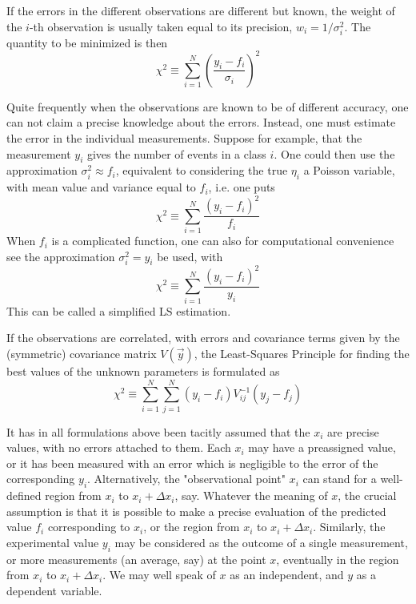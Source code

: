 \documentclass[../main.tex]{subfiles}
\begin{document}
If the errors in the different observations are different but known,
the weight of the $i$-th observation is usually taken equal to its precision,
$w_i = 1 / \sigma_i^2$.
The quantity to be minimized is then
%
\begin{equation}
    \chi^2 \equiv \sum_{i=1}^N \left(\frac{y_i - f_i}{\sigma_i}\right)^2
    \label{eq:10.3}
\end{equation}

Quite frequently when the observations are known to be of different accuracy,
one can not claim a precise knowledge about the errors.
Instead, one must estimate the error in the individual measurements.
Suppose for example, that the measurement $y_i$ gives the number of events in a class $i$.
One could then use the approximation $\sigma_i^2 \approx f_i$,
equivalent to considering the true $\eta_i$ a Poisson variable,
with mean value and variance equal to $f_i$,
i.e. one puts
%
\begin{equation}
    \chi^2 \equiv \sum_{i=1}^N \frac{(y_i - f_i)^2}{f_i}
    \label{eq:10.4}
\end{equation}
%
When $f_i$ is a complicated function,
one can also for computational convenience see the approximation $\sigma_i^2 = y_i$ be used,
with
%
\begin{equation}
    \chi^2 \equiv \sum_{i=1}^N \frac{(y_i - f_i)^2}{y_i}
    \label{eq:10.5}
\end{equation}
%
This can be called a simplified LS estimation.

If the observations are correlated,
with errors and covariance terms given by the (symmetric) covariance matrix $V(\vec{y})$,
the Least-Squares Principle for finding the best values of the unknown parameters is formulated as
%
\begin{equation}
    \chi^2 \equiv \sum_{i=1}^N \sum_{j=1}^N (y_i - f_i) V^{-1}_{ij} (y_j - f_j)
    \label{eq:10.6}
\end{equation}

It has in all formulations above been tacitly assumed that the $x_i$ are precise values,
with no errors attached to them.
Each $x_i$ may have a preassigned value,
or it has been measured with an error which is negligible to the error of the corresponding $y_i$.
Alternatively, the "observational point" $x_i$ can stand for a well-defined region from $x_i$ to $x_i + \Delta x_i$, say.
Whatever the meaning of $x$,
the crucial assumption is that it is possible to make a precise evaluation of the predicted value $f_i$ corresponding to $x_i$,
or the region from $x_i$ to $x_i + \Delta x_i$.
Similarly,
the experimental value $y_i$ may be considered as the outcome of a single measurement,
or more measurements (an average, say) at the point $x$,
eventually in the region from $x_i$ to $x_i + \Delta x_i$.
We may well speak of $x$ as an independent, and $y$ as a dependent variable.
\end{document}
